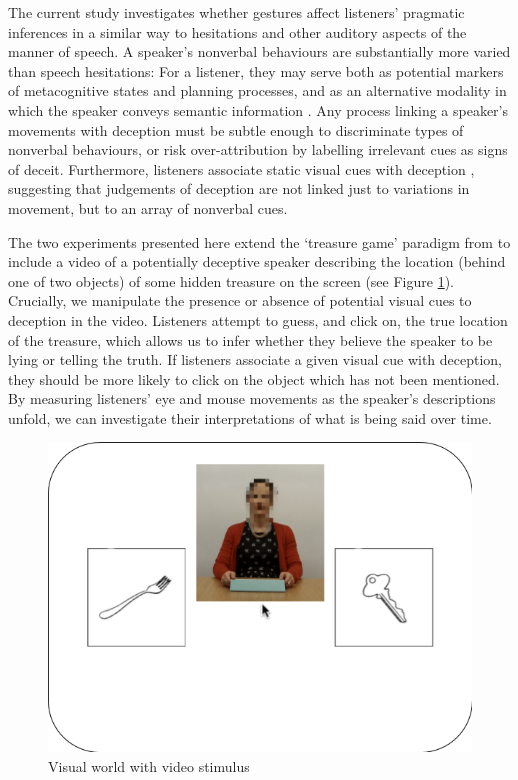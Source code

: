 \documentclass[a4paper,man,natbib]{apa6}
\begin{document}
The current study investigates whether gestures affect listeners' pragmatic inferences in a similar way to hesitations and other auditory aspects of the manner of speech.
A speaker's nonverbal behaviours are substantially more varied than speech hesitations: For a listener, they may serve both as potential markers of metacognitive states and planning processes, and as an alternative modality in which the speaker conveys semantic information \citep[See, e.g.][]{Ekman1969,Mcneill1992}.
Any process linking a speaker's movements with deception must be subtle enough to discriminate types of nonverbal behaviours, or risk over-attribution by labelling irrelevant cues as signs of deceit.
Furthermore, listeners associate static visual cues with deception \citep[e.g. eye gaze,][]{Zuckerman1981a}, suggesting that judgements of deception are not linked just to variations in movement, but to an array of nonverbal cues. 

The two experiments presented here extend the `treasure game' paradigm from \citet{Loy2017} to include a video of a potentially deceptive speaker describing the location (behind one of two objects) of some hidden treasure on the screen (see Figure \ref{fig:v1_layout}).
Crucially, we manipulate the presence or absence of potential visual cues to deception in the video.
Listeners attempt to guess, and click on, the true location of the treasure, which allows us to infer whether they believe the speaker to be lying or telling the truth.
If listeners associate a given visual cue with deception, they should be more likely to click on the object which has not been mentioned.
By measuring listeners' eye  and mouse movements as the speaker's descriptions unfold, we can investigate their interpretations of what is being said over time.

\begin{figure}[Ht]
  \centering
	\includegraphics[width=\linewidth]{./img/e7_layout.png}
  \caption{Visual world with video stimulus}
  \label{fig:v1_layout}
\end{figure}
\end{document}
